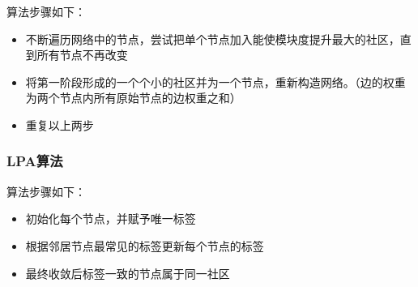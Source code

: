 \documentclass[12pt]{report}
\begin{document}
				算法步骤如下：
				\begin{itemize}
					\item 不断遍历网络中的节点，尝试把单个节点加入能使模块度提升最大的社区，直到所有节点不再改变 
					\item 将第一阶段形成的一个个小的社区并为一个节点，重新构造网络。（边的权重为两个节点内所有原始节点的边权重之和）
					\item 重复以上两步
				\end{itemize}
			
			\subsubsection{LPA算法}
				
				算法步骤如下：
				\begin{itemize}
					\item 初始化每个节点，并赋予唯一标签 
					\item 根据邻居节点最常见的标签更新每个节点的标签 
					\item 最终收敛后标签一致的节点属于同一社区
				\end{itemize}
			
			
			
				
\end{document}
